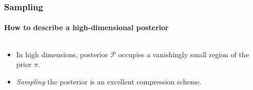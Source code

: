 \documentclass[%
]{beamer}
\newcommand{\posterior}{\mathcal{P}}
\newcommand{\prior}{\pi}
\begin{document}
\begin{frame}
    \frametitle{Sampling}
    \framesubtitle{How to describe a high-dimensional posterior}

	\begin{columns}
	\begin{column}{0.5\textwidth}
		\begin{itemize}
          \item<3-> In high dimensions, posterior $\posterior$ occupies a vanishingly small region of the prior $\prior$.
          \item<4-> {\em Sampling\/} the posterior is an excellent compression scheme.
		\end{itemize}
	\end{column}
	\begin{column}{0.5\textwidth}
	\end{column}
	\end{columns}
 
\end{frame}
\end{document}
